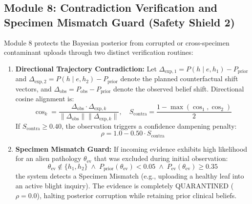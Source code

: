 \documentclass[conference]{IEEEtran}
\begin{document}
\subsection{Module 8: Contradiction Verification and Specimen Mismatch Guard (Safety Shield 2)}
Module 8 protects the Bayesian posterior from corrupted or cross-specimen contaminant uploads through two distinct verification routines:
\begin{enumerate}
    \item \textbf{Directional Trajectory Contradiction:}
    Let $\Delta_{\text{exp}, 1} = P(h \mid e, h_1) - P_{\text{prior}}$ and $\Delta_{\text{exp}, 2} = P(h \mid e, h_2) - P_{\text{prior}}$ denote the planned counterfactual shift vectors, and $\Delta_{\text{obs}} = P_{\text{obs}} - P_{\text{prior}}$ denote the observed belief shift. Directional cosine alignment is:
    \begin{equation}
        \cos_k = \frac{\Delta_{\text{obs}} \cdot \Delta_{\text{exp}, k}}{\|\Delta_{\text{obs}}\| \|\Delta_{\text{exp}, k}\|}, \quad S_{\text{contra}} = \frac{1 - \max(\cos_1, \cos_2)}{2}
    \end{equation}
    If $S_{\text{contra}} \ge 0.40$, the observation triggers a confidence dampening penalty:
    \begin{equation}
        \rho = 1.0 - 0.50 \cdot S_{\text{contra}}
    \end{equation}
    \item \textbf{Specimen Mismatch Guard:}
    If incoming evidence exhibits high likelihood for an alien pathology $\theta_{\text{ev}}$ that was excluded during initial observation:
    \begin{equation}
        \theta_{\text{ev}} \notin \{h_1, h_2\} \;\wedge\; P_{\text{prior}}(\theta_{\text{ev}}) < 0.05 \;\wedge\; P_{\text{ev}}(\theta_{\text{ev}}) \ge 0.35
    \end{equation}
    the system detects a Specimen Mismatch (e.g., uploading a healthy leaf into an active blight inquiry). The evidence is completely QUARANTINED ($\rho = 0.0$), halting posterior corruption while retaining prior clinical beliefs.
\end{enumerate}
\end{document}
